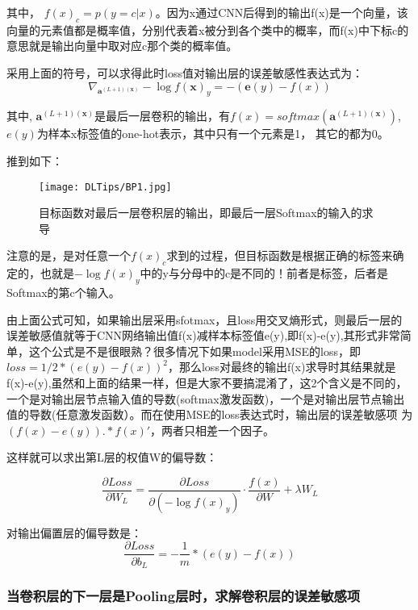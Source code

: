 其中， $f(x)_c = p(y = c|x)$。因为x通过CNN后得到的输出f(x)是一个向量，该向量的元素值都是概率值，分别代表着x被分到各个类中的概率，而f(x)中下标c的意思就是输出向量中取对应c那个类的概率值。

采用上面的符号，可以求得此时loss值对输出层的误差敏感性表达式为：
\begin{displaymath}
\nabla_{\mathbf{a}^{(L+1)(\mathbf{x})}} - \log f(\mathbf{x})_y = -(\mathbf{e}(y) - f(x))
\end{displaymath}

其中, $\mathbf{a}^{(L+1)(\mathbf{x})}$是最后一层卷积的输出，有$f(x) = softmax(\mathbf{a}^{(L+1)(\mathbf{x})})$, $e(y)$为样本x标签值的one-hot表示，其中只有一个元素是1， 其它的都为0。


推到如下：
\begin{figure}[!hbtp]
\centering
\texttt{[image: DLTips/BP1.jpg]}
\caption{目标函数对最后一层卷积层的输出，即最后一层Softmax的输入的求导}
\label{BP1}
\end{figure}

注意的是，是对任意一个$f(x)_c$求到的过程，但目标函数是根据正确的标签来确定的，也就是$-\log f(x)_y$中的y与分母中的c是不同的！前者是标签，后者是Softmax的第c个输入。

由上面公式可知，如果输出层采用sfotmax，且loss用交叉熵形式，则最后一层的误差敏感值就等于CNN网络输出值f(x)减样本标签值e(y),即f(x)-e(y),其形式非常简单，这个公式是不是很眼熟？很多情况下如果model采用MSE的loss，即$loss=1/2*(e(y)-f(x))^2$，那么loss对最终的输出f(x)求导时其结果就是f(x)-e(y),虽然和上面的结果一样，但是大家不要搞混淆了，这2个含义是不同的，一个是对输出层节点输入值的导数(softmax激发函数)，一个是对输出层节点输出值的导数(任意激发函数）。而在使用MSE的loss表达式时，输出层的误差敏感项
为$(f(x)-e(y)).*f(x)'$，两者只相差一个因子。

这样就可以求出第L层的权值W的偏导数：

\begin{displaymath}
\frac{\partial Loss}{\partial W_L} = \frac{\partial Loss}{\partial (-\log f(x)_y)} \cdot \frac{f(x)}{\partial W} + \lambda W_L
\end{displaymath}

对输出偏置层的偏导数是：
\begin{displaymath}
\frac{\partial Loss}{\partial b_L} = -\frac{1}{m} * (e(y) - f(x))
\end{displaymath}

\subsubsection{当卷积层的下一层是Pooling层时，求解卷积层的误差敏感项}

